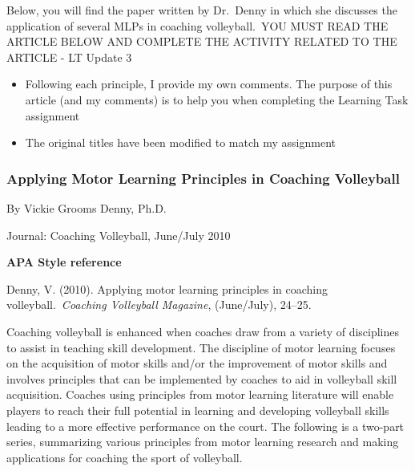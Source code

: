 \documentclass[
  letterpaper,
  DIV=11,
  numbers=noendperiod]{scrartcl}
\begin{document}
\begin{tcolorbox}[enhanced jigsaw, leftrule=.75mm, breakable, colframe=quarto-callout-color-frame, arc=.35mm, bottomrule=.15mm, left=2mm, rightrule=.15mm, opacityback=0, toprule=.15mm, colback=white]

Below, you will find the paper written by Dr.~Denny in which she
discusses the application of several MLPs in coaching volleyball.~YOU
MUST READ THE ARTICLE BELOW AND COMPLETE THE ACTIVITY RELATED TO THE
ARTICLE - LT Update 3

\begin{itemize}
\item
  Following each principle, I provide my own comments. The purpose of
  this article (and my comments) is to help you when completing the
  Learning Task assignment
\item
  The original titles have been modified to match my assignment
\end{itemize}

\end{tcolorbox}

\hypertarget{applying-motor-learning-principles-in-coaching-volleyball}{%
\subsubsection{\texorpdfstring{\textbf{Applying Motor Learning
Principles in Coaching
Volleyball}}{Applying Motor Learning Principles in Coaching Volleyball}}\label{applying-motor-learning-principles-in-coaching-volleyball}}

By Vickie Grooms Denny, Ph.D.

Journal: Coaching Volleyball, June/July 2010

\textbf{APA Style reference}

Denny, V. (2010). Applying motor learning principles in coaching
volleyball.~\emph{Coaching Volleyball Magazine}, (June/July), 24--25.

Coaching volleyball is enhanced when coaches draw from a variety of
disciplines to assist in teaching skill development. The discipline of
motor learning focuses on the acquisition of motor skills and/or the
improvement of motor skills and involves principles that can be
implemented by coaches to aid in volleyball skill acquisition. Coaches
using principles from motor learning literature will enable players to
reach their full potential in learning and developing volleyball skills
leading to a more effective performance on the court. The following is a
two-part series, summarizing various principles from motor learning
research and making applications for coaching the sport of volleyball.
\end{document}
